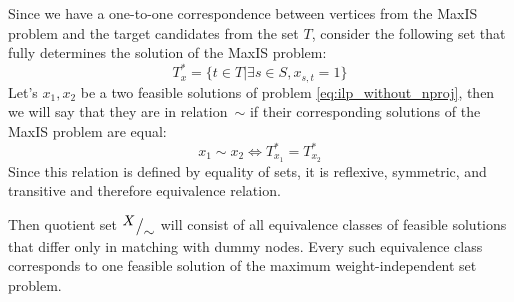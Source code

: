 Since we have a one-to-one correspondence between vertices from the MaxIS problem and the target
candidates from the set \( T \), consider the following set that fully determines the solution of the
MaxIS problem:
\[
  T^*_{x} = \{ t \in T | \exists s \in S, x_{s, t} = 1 \}
\]
Let's \( x_1, x_2 \) be a two feasible solutions of problem \eqref{eq:ilp_without_nproj}, then we will say that
they are in relation~\( \sim \) if their corresponding solutions of the MaxIS problem are equal:
\[
  x_1 \sim x_2 \Leftrightarrow T^{*}_{x_1} = T^{*}_{x_2}
\]
Since this relation is defined by equality of sets, it is reflexive, symmetric, and transitive and therefore
equivalence relation.

Then quotient set \( {^{\textstyle X}\big/_{\textstyle \sim}} \) will consist of all equivalence classes of feasible solutions
that differ only in matching with dummy nodes. Every such equivalence class corresponds to one feasible solution of
the maximum weight-independent set problem.


